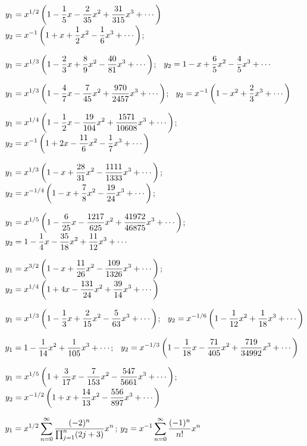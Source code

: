 \medskip

$y_{1}=\displaystyle{x^{1/2}\left(1-\frac{1}{5}x-\frac{2}{35}x^{2}
+\frac{31}{315}x^{3}+\cdots\right)}$  \,
$y_{2}=\displaystyle{x^{-1}\left(1+x+\frac{1}{2}x^{2}-\frac{1}{6}x^{3}+\cdots\right)}$; \,

$y_{1}=\displaystyle{x^{1/3}\left(1-\frac{2}{3}x+\frac{8}{9}x^{2}-
\frac{40}{81}x^{3}+\cdots\right)}$; \,
$y_{2}=\displaystyle{1-x+\frac{6}{5}x^{2}-\frac{4}{5}x^{3}+\cdots}$

$y_{1}=\displaystyle{x^{1/3}\left(1-\frac{4}{7}x-\frac{7}{45}x^{2}+
\frac{970}{2457}x^{3}+\cdots\right)}$; \,
$y_{2}=\displaystyle{x^{-1}\left(1-x^{2}+\frac{2}{3}x^{3}+\cdots\right)}$

$y_{1}=\displaystyle{x^{1/4}\left(1-\frac{1}{2}x-\frac{19}{104}x^{2}+
\frac{1571}{10608}x^{3}+\cdots\right)}$; \,
$y_{2}=\displaystyle{x^{-1}\left(1+2x-\frac{11}{6}x^{2}-\frac{1}{7}x^{3}+\cdots\right)}$

$y_{1}=\displaystyle{x^{1/3}\left(1-x+\frac{28}{31}x^{2}-\frac{1111}{1333}x^{3}
+\cdots\right)}$; \,
$y_{2}=\displaystyle{x^{-1/4}\left(1-x+\frac{7}{8}x^{2}-\frac{19}{24}x^{3}+
\cdots\right)}$; \,

$y_{1}=\displaystyle{x^{1/5}\left(1-\frac{6}{25}x-\frac{1217}{625}x^{2}+
\frac{41972}{46875}x^{3}
+\cdots\right)}$; \,
$y_{2}=\displaystyle{1-\frac{1}{4}x-\frac{35}{18}x^{2}+\frac{11}{12}x^{3}+\cdots}$

$y_{1}=\displaystyle{x^{3/2}\left(1-x+\frac{11}{26}x^{2}-\frac{109}{1326}x^{3}+
\cdots\right)}$; \,
$y_{2}=\displaystyle{x^{1/4}\left(1+4x-\frac{131}{24}x^{2}+\frac{39}{14}x^{3}+
\cdots\right)}$

$y_{1}=\displaystyle{x^{1/3}\left(1-\frac{1}{3}x+\frac{2}{15}x^{2}-
\frac{5}{63}x^{3}+\cdots\right)}$; \,
$y_{2}=\displaystyle{x^{-1/6}\left(1-\frac{1}{12}x^{2}+\frac{1}{18}x^{3}+\cdots\right)}$

$y_{1}=\displaystyle{1-\frac{1}{14}x^{2}+\frac{1}{105}x^{3}+\cdots}$; \,
$y_{2}=\displaystyle{x^{-1/3}\left(1-\frac{1}{18}x-\frac{71}{405}x^{2}+
\frac{719}{34992}x^{3}+\cdots\right)}$

$y_{1}=\displaystyle{x^{1/5}\left(1+\frac{3}{17}x-\frac{7}{153}x^{2}-
\frac{547}{5661}x^{3}+\cdots\right)}$; \,
$y_{2}=\displaystyle{x^{-1/2}\left(1+x+\frac{14}{13}x^{2}-\frac{556}{897}x^{3}+\cdots\right)}$

$y_{1}=\displaystyle{x^{1/2}\sum_{n=0}^{\infty}\frac{(-2)^{n}}{\prod_{j=1}^{n}(2j+3)}x^{n}}$;
$y_{2}=\displaystyle{x^{-1}\sum_{n=0}^{\infty}\frac{(-1)^{n}}{n!}x^{n}}$

